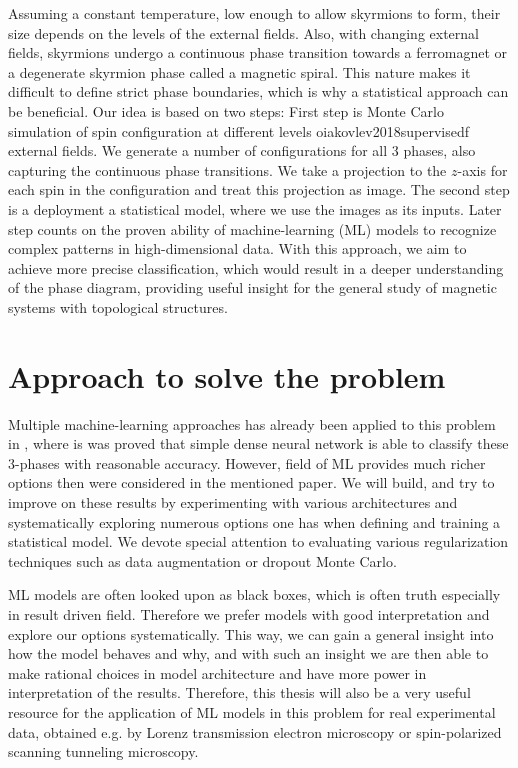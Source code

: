 Assuming a constant temperature, low enough to allow skyrmions to form, their size depends on the levels of the external fields. Also, with changing external fields, skyrmions undergo a continuous phase transition towards a ferromagnet or a degenerate skyrmion phase called a magnetic spiral. This nature makes it difficult to define strict phase boundaries, which is why a statistical approach can be beneficial. Our idea is based on two steps: First step is Monte Carlo simulation of spin configuration at different levels oiakovlev2018supervisedf external fields. We generate a number of configurations for all 3 phases, also capturing the continuous phase transitions. We take a projection to the $z$-axis for each spin in the configuration and treat this projection as image. The second step is a deployment a statistical model, where we use the images as its inputs. Later step counts on the proven ability of machine-learning (ML) models to recognize complex patterns in high-dimensional data. With this approach, we aim to achieve more precise classification, which would result in a deeper understanding of the phase diagram, providing useful insight for the general study of magnetic systems with topological structures.

\section*{Approach to solve the problem}

Multiple machine-learning approaches has already been applied to this problem in \citet{iakovlev2018supervised}, where is was proved that simple dense neural network is able to classify these 3-phases with reasonable accuracy. However, field of ML provides much richer options then were considered in the mentioned paper. We will build, and try to improve on these results by experimenting with various architectures and systematically exploring numerous options one has when defining and training a statistical model. We devote special attention to evaluating various regularization techniques such as data augmentation or dropout Monte Carlo.

ML models are often looked upon as black boxes, which is often truth especially in result driven field. Therefore we prefer models with good interpretation and explore our options systematically. This way, we can gain a general insight into how the model behaves and why, and with such an insight we are then able to make rational choices in model architecture and have more power in interpretation of the results. Therefore, this thesis will also be a very useful resource for the application of ML models in this problem for real experimental data, obtained e.g. by Lorenz transmission electron microscopy or spin-polarized scanning tunneling microscopy.

